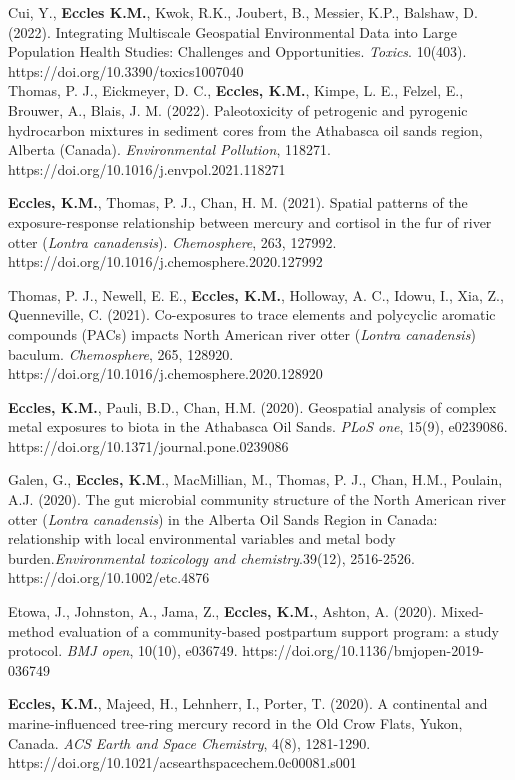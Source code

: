 \documentclass[margin,line]{res}
\begin{document}
\begin{resume}
Cui, Y., \textbf{Eccles K.M.}, Kwok, R.K., Joubert, B., Messier, K.P., Balshaw, D. (2022). Integrating Multiscale Geospatial Environmental Data into Large Population Health Studies: Challenges and Opportunities. \textit{Toxics}. 10(403). https://doi.org/10.3390/toxics1007040\\

Thomas, P. J., Eickmeyer, D. C., \textbf{Eccles, K.M.}, Kimpe, L. E., Felzel, E., Brouwer, A., Blais, J. M. (2022). Paleotoxicity of petrogenic and pyrogenic hydrocarbon mixtures in sediment cores from the Athabasca oil sands region, Alberta (Canada). \textit{Environmental Pollution}, 118271. \\
https://doi.org/10.1016/j.envpol.2021.118271

\textbf{Eccles, K.M.}, Thomas, P. J., Chan, H. M. (2021). Spatial patterns of the exposure-response relationship between mercury and cortisol in the fur of river otter (\textit{Lontra canadensis}). \textit{Chemosphere}, 263, 127992. https://doi.org/10.1016/j.chemosphere.2020.127992

Thomas, P. J., Newell, E. E., \textbf{Eccles, K.M.}, Holloway, A. C., Idowu, I., Xia, Z., Quenneville, C. (2021). Co-exposures to trace elements and polycyclic aromatic compounds (PACs) impacts North American river otter (\textit{Lontra canadensis}) baculum. \textit{Chemosphere}, 265, 128920.\\https://doi.org/10.1016/j.chemosphere.2020.128920

\textbf{Eccles, K.M.}, Pauli, B.D., Chan, H.M. (2020). Geospatial analysis of complex metal exposures to biota in the Athabasca Oil Sands. \textit{PLoS one}, 15(9), e0239086. \\https://doi.org/10.1371/journal.pone.0239086

Galen, G., \textbf{Eccles, K.M}., MacMillian, M., Thomas, P. J., Chan, H.M., Poulain, A.J. (2020). The gut microbial community structure of the North American river otter (\textit{Lontra canadensis}) in the Alberta Oil Sands Region in Canada: relationship with local environmental variables and metal body burden.\textit{Environmental toxicology and chemistry}.39(12), 2516-2526. https://doi.org/10.1002/etc.4876

Etowa, J., Johnston, A., Jama, Z., \textbf{Eccles, K.M.}, Ashton, A. (2020). Mixed-method evaluation of a community-based postpartum support program: a study protocol. \textit{BMJ open}, 10(10), e036749. https://doi.org/10.1136/bmjopen-2019-036749

\textbf{Eccles, K.M.}, Majeed, H., Lehnherr, I., Porter, T. (2020). A continental and marine-influenced tree-ring mercury record in the Old Crow Flats, Yukon, Canada. \textit{ACS Earth and Space Chemistry}, 4(8), 1281-1290. https://doi.org/10.1021/acsearthspacechem.0c00081.s001


\end{resume}
\end{document}
